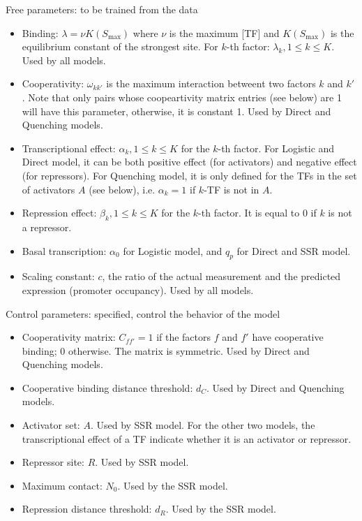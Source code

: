 \documentclass[11pt]{article}
\begin{document}
\begin{enumerate}
\begin{enumerate}
Free parameters: to be trained from the data
\begin{itemize}
\item Binding: $\lambda = \nu K(S_{\max})$ where $\nu$ is the maximum [TF] and $K(S_{\max})$ is the equilibrium constant of the strongest site. For $k$-th factor: $\lambda_k, 1 \leq k \leq K$. Used by all models. 
\item Cooperativity: $\omega_{kk'}$ is the maximum interaction betweent two factors $k$ and $k'$. Note that only pairs whose coopeartivity matrix entries (see below) are 1 will have this parameter, otherwise, it is constant 1. Used by Direct and Quenching models. 
\item Transcriptional effect: $\alpha_k, 1 \leq k \leq K$ for the $k$-th factor. For Logistic and Direct model, it can be both positive effect (for activators) and negative effect (for repressors). For Quenching model, it is only defined for the TFs in the set of activators $A$ (see below), i.e. $\alpha_k = 1$ if $k$-TF is not in $A$. 
\item Repression effect: $\beta_k, 1 \leq k \leq K$ for the $k$-th factor. It is equal to 0 if $k$ is not a repressor. 
\item Basal transcription: $\alpha_0$ for Logistic model, and $q_p$ for Direct and SSR model. 
\item Scaling constant: $c$, the ratio of the actual measurement and the predicted expression (promoter occupancy). Used by all models. 
\end{itemize}

Control parameters: specified, control the behavior of the model
\begin{itemize}
\item Cooperativity matrix: $C_{ff'} = 1$ if the factors $f$ and $f'$ have cooperative binding; 0 otherwise. The matrix is symmetric. Used by Direct and Quenching models. 
\item Cooperative binding distance threshold: $d_C$. Used by Direct and Quenching models. 
\item Activator set: $A$. Used by SSR model. For the other two models, the transcriptional effect of a TF indicate whether it is an activator or repressor. 
\item Repressor site: $R$. Used by SSR model. 
\item Maximum contact: $N_0$. Used by the SSR model. 
\item Repression distance threshold: $d_R$. Used by the SSR model. 
\end{itemize}


\end{enumerate}
\end{enumerate}
\end{document}
